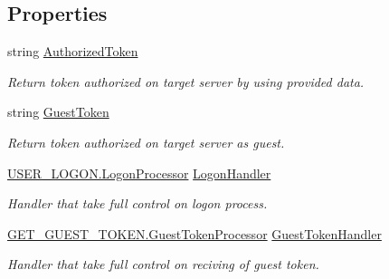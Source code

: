\subsection*{Properties}
\begin{DoxyCompactItemize}
\item 
string \mbox{\hyperlink{class_pipes_provider_1_1_networking_1_1_routing_1_1_authorized_instruction_a0f856748d300d23a203b5e289007d6fd}{Authorized\+Token}}
\begin{DoxyCompactList}\small\item\em Return token authorized on target server by using provided data. \end{DoxyCompactList}\item 
string \mbox{\hyperlink{class_pipes_provider_1_1_networking_1_1_routing_1_1_authorized_instruction_a5bc07dddc515afbe5dc2dcd64c8314ee}{Guest\+Token}}
\begin{DoxyCompactList}\small\item\em Return token authorized on target server as guest. \end{DoxyCompactList}\item 
\mbox{\hyperlink{class_authority_controller_1_1_queries_1_1_u_s_e_r___l_o_g_o_n_1_1_logon_processor}{U\+S\+E\+R\+\_\+\+L\+O\+G\+O\+N.\+Logon\+Processor}} \mbox{\hyperlink{class_pipes_provider_1_1_networking_1_1_routing_1_1_authorized_instruction_a9f1721ee3d1fbb3803b77a991f5e1a03}{Logon\+Handler}}
\begin{DoxyCompactList}\small\item\em Handler that take full control on logon process. \end{DoxyCompactList}\item 
\mbox{\hyperlink{class_authority_controller_1_1_queries_1_1_g_e_t___g_u_e_s_t___t_o_k_e_n_1_1_guest_token_processor}{G\+E\+T\+\_\+\+G\+U\+E\+S\+T\+\_\+\+T\+O\+K\+E\+N.\+Guest\+Token\+Processor}} \mbox{\hyperlink{class_pipes_provider_1_1_networking_1_1_routing_1_1_authorized_instruction_a69c5e303ece339342c6979ba11436d82}{Guest\+Token\+Handler}}
\begin{DoxyCompactList}\small\item\em Handler that take full control on reciving of guest token. \end{DoxyCompactList}\end{DoxyCompactItemize}
